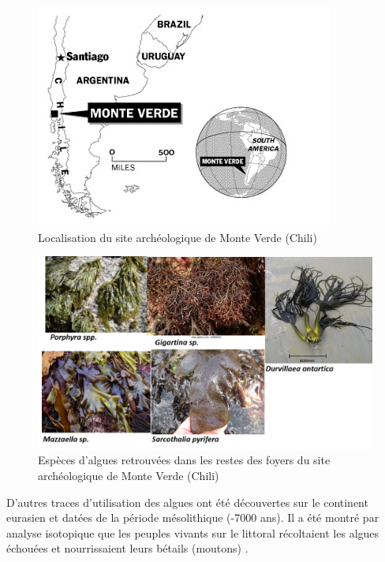 \documentclass[
]{book}
\begin{document}
\begin{figure}

{\centering \includegraphics{images/Monte_verde} 

}

\caption{Localisation du site archéologique de Monte Verde (Chili)}\label{fig:monteverde}
\end{figure}

\begin{figure}

{\centering \includegraphics{images/Monte_verde_algue} 

}

\caption{Espèces d'algues retrouvées dans les restes des foyers du site archéologique de Monte Verde (Chili)}\label{fig:monteverdealgue}
\end{figure}

D'autres traces d'utilisation des algues ont été découvertes sur le continent eurasien et datées de la période mésolithique (-7000 ans). Il a été montré par analyse isotopique que les peuples vivants sur le littoral récoltaient les algues échouées et nourrissaient leurs bétails (moutons) \citep{balasse2005}.
\end{document}
